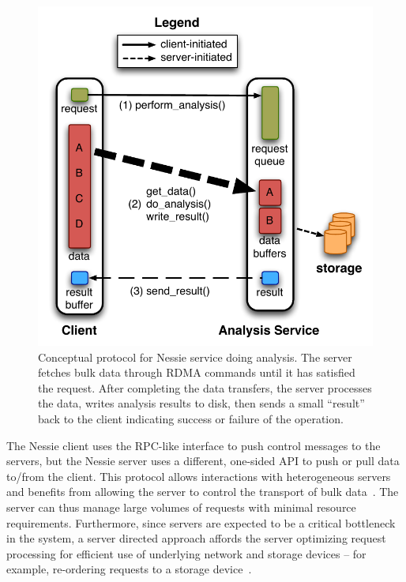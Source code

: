 \begin{figure}
\begin{centering}
\includegraphics[scale=0.6]{figures/ServerDirected}
\caption[Nessie transport protocol]{Conceptual protocol for Nessie service doing analysis.  
The server fetches bulk data through
RDMA commands until it has satisfied the request.  After completing the
data transfers, the server processes the data, writes analysis results
to disk, then sends a small ``result'' back to the client
indicating success or failure of the operation.}
\label{fig:nssi-movement-protocol}
\end{centering}
\end{figure}

The Nessie client uses the RPC-like interface to push control messages to the
servers, but the Nessie server uses a different, one-sided API to push or pull
data to/from the client. This protocol allows interactions with heterogeneous
servers and benefits from allowing the server to control the transport of
bulk data~\cite{kotz:bdiskdir,seamons:panda}. The server can thus manage large
volumes of requests with minimal resource requirements. Furthermore, since
servers are expected to be a critical bottleneck in the system, a server
directed approach affords the server optimizing request processing for
efficient use of underlying network and storage devices -- for example,
re-ordering requests to a storage device~\cite{kotz:bdiskdir}.

